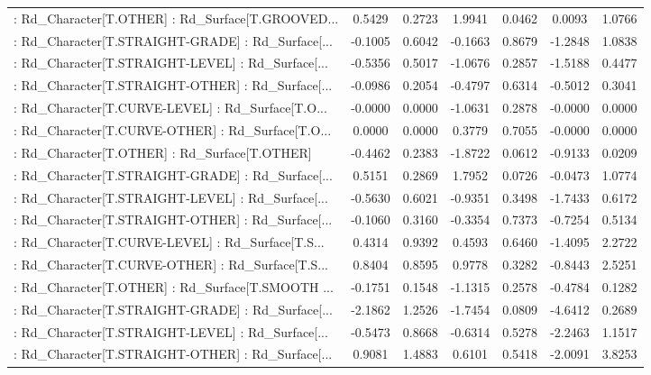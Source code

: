 \begin{longtable}{p{4cm}cccccc}
 : Rd\_Character[T.OTHER] : Rd\_Surface[T.GROOVED... &  0.5429 &    0.2723 &  1.9941 &       0.0462 &  0.0093 &  1.0766 \\
 : Rd\_Character[T.STRAIGHT-GRADE] : Rd\_Surface[... & -0.1005 &    0.6042 & -0.1663 &       0.8679 & -1.2848 &  1.0838 \\
 : Rd\_Character[T.STRAIGHT-LEVEL] : Rd\_Surface[... & -0.5356 &    0.5017 & -1.0676 &       0.2857 & -1.5188 &  0.4477 \\
 : Rd\_Character[T.STRAIGHT-OTHER] : Rd\_Surface[... & -0.0986 &    0.2054 & -0.4797 &       0.6314 & -0.5012 &  0.3041 \\
 : Rd\_Character[T.CURVE-LEVEL] : Rd\_Surface[T.O... & -0.0000 &    0.0000 & -1.0631 &       0.2878 & -0.0000 &  0.0000 \\
 : Rd\_Character[T.CURVE-OTHER] : Rd\_Surface[T.O... &  0.0000 &    0.0000 &  0.3779 &       0.7055 & -0.0000 &  0.0000 \\
 : Rd\_Character[T.OTHER] : Rd\_Surface[T.OTHER]     & -0.4462 &    0.2383 & -1.8722 &       0.0612 & -0.9133 &  0.0209 \\
 : Rd\_Character[T.STRAIGHT-GRADE] : Rd\_Surface[... &  0.5151 &    0.2869 &  1.7952 &       0.0726 & -0.0473 &  1.0774 \\
 : Rd\_Character[T.STRAIGHT-LEVEL] : Rd\_Surface[... & -0.5630 &    0.6021 & -0.9351 &       0.3498 & -1.7433 &  0.6172 \\
 : Rd\_Character[T.STRAIGHT-OTHER] : Rd\_Surface[... & -0.1060 &    0.3160 & -0.3354 &       0.7373 & -0.7254 &  0.5134 \\
 : Rd\_Character[T.CURVE-LEVEL] : Rd\_Surface[T.S... &  0.4314 &    0.9392 &  0.4593 &       0.6460 & -1.4095 &  2.2722 \\
 : Rd\_Character[T.CURVE-OTHER] : Rd\_Surface[T.S... &  0.8404 &    0.8595 &  0.9778 &       0.3282 & -0.8443 &  2.5251 \\
 : Rd\_Character[T.OTHER] : Rd\_Surface[T.SMOOTH ... & -0.1751 &    0.1548 & -1.1315 &       0.2578 & -0.4784 &  0.1282 \\
 : Rd\_Character[T.STRAIGHT-GRADE] : Rd\_Surface[... & -2.1862 &    1.2526 & -1.7454 &       0.0809 & -4.6412 &  0.2689 \\
 : Rd\_Character[T.STRAIGHT-LEVEL] : Rd\_Surface[... & -0.5473 &    0.8668 & -0.6314 &       0.5278 & -2.2463 &  1.1517 \\
 : Rd\_Character[T.STRAIGHT-OTHER] : Rd\_Surface[... &  0.9081 &    1.4883 &  0.6101 &       0.5418 & -2.0091 &  3.8253 \\

\end{longtable}
